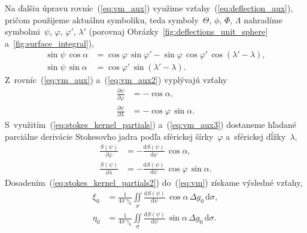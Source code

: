 \documentclass[a4paper, 12pt]{book}
\newcommand{\diff}{\mathrm d}
\begin{document}
%
Na ďalšiu úpravu rovníc~(\ref{eq:vm_aux}) využime 
vzťahy~(\ref{eq:deflection_aux}), pričom použijeme aktuálnu symboliku, teda 
symboly~$\Theta$, $\phi$, $\Phi$, $\Lambda$ nahradíme symbolmi~$\psi$, 
$\varphi$, $\varphi'$, $\lambda'$ (porovnaj 
Obrázky~\ref{fig:deflections_unit_sphere} a~\ref{fig:surface_integral}),
%
\begin{equation}
\label{eq:vm_aux2}
\begin{split}
\sin\psi \, \cos\alpha &= \cos\varphi \, \sin\varphi' - \sin\varphi \, 
\cos\varphi' \, \cos(\lambda' - \lambda){,}\\
\sin\psi \, \sin\alpha &= \cos\varphi' \, \sin(\lambda' - \lambda){.}
\end{split}
\end{equation}
%
Z~rovníc~(\ref{eq:vm_aux}) a~(\ref{eq:vm_aux2}) vyplývajú vzťahy
%
\begin{equation}
\label{eq:vm_aux3}
\begin{split}
\frac{\partial\psi}{\partial\varphi} &= -\cos\alpha{,}\\
%
\frac{\partial\psi}{\partial\lambda} &= -\cos\varphi \, \sin\alpha{.}
\end{split}
\end{equation}
%
S~využitím~(\ref{eq:stokes_kernel_partials}) a~(\ref{eq:vm_aux3}) dostaneme 
hľadané parciálne derivácie Stokesovho jadra podľa sférickej šírky~$\varphi$ 
a~sférickej dĺžky~$\lambda$,
%
\begin{equation}
\label{eq:stokes_kernel_partials2}
\begin{split}
\frac{S(\psi)}{\partial\varphi} &= -\frac{\diff S(\psi)}{\diff \psi} \, 
\cos\alpha{,}\\
%
\frac{S(\psi)}{\partial\lambda} &= -\frac{\diff S(\psi)}{\diff \psi} \, 
\cos\varphi \, \sin\alpha{.}
\end{split}
\end{equation}
%
Dosadením~(\ref{eq:stokes_kernel_partials2}) do~(\ref{eq:vm}) získame výsledné 
vzťahy,
    \begin{equation}
\label{eq:vm2}
\begin{split}
\xi_0 &= \frac{1}{4\pi\,\gamma_0} \iint\limits_\sigma \frac{\diff 
S(\psi)}{\diff \psi} \, \cos\alpha \, \Delta g_0 \, \diff\sigma{,}\\
\eta_0 &= \frac{1}{4\pi\,\gamma_0} \iint\limits_\sigma \frac{\diff 
S(\psi)}{\diff \psi} \, \sin\alpha \, \Delta g_0 \, \diff\sigma{.}
\end{split}
\end{equation}
\end{document}
